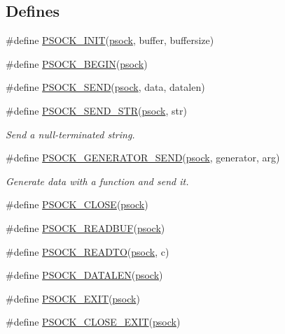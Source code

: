 \subsection*{Defines}
\begin{DoxyCompactItemize}
\item 
\#define \hyperlink{group__psock_ga26ae707402e494f3895a9f012a93ea29}{PSOCK\_\-INIT}(\hyperlink{structpsock}{psock}, buffer, buffersize)
\item 
\#define \hyperlink{group__psock_ga84901a5aa60040e96d272a69977edd22}{PSOCK\_\-BEGIN}(\hyperlink{structpsock}{psock})
\item 
\#define \hyperlink{group__psock_ga70d236d1cf34b4e21836edda60247b70}{PSOCK\_\-SEND}(\hyperlink{structpsock}{psock}, data, datalen)
\item 
\#define \hyperlink{group__psock_gab0ad55aa96dd1d200cd0fc5a99f6a4f7}{PSOCK\_\-SEND\_\-STR}(\hyperlink{structpsock}{psock}, str)
\begin{DoxyCompactList}\small\item\em Send a null-\/terminated string. \item\end{DoxyCompactList}\item 
\#define \hyperlink{group__psock_ga10d9a9201cba1a6db623284c475c6cea}{PSOCK\_\-GENERATOR\_\-SEND}(\hyperlink{structpsock}{psock}, generator, arg)
\begin{DoxyCompactList}\small\item\em Generate data with a function and send it. \item\end{DoxyCompactList}\item 
\#define \hyperlink{group__psock_ga5d56800f82bfc7bbf53bb4a659589812}{PSOCK\_\-CLOSE}(\hyperlink{structpsock}{psock})
\item 
\#define \hyperlink{group__psock_gad895ab98c54d9966ff554aa873151751}{PSOCK\_\-READBUF}(\hyperlink{structpsock}{psock})
\item 
\#define \hyperlink{group__psock_gab5d9c0becf7cb32d0aaef466839dd92e}{PSOCK\_\-READTO}(\hyperlink{structpsock}{psock}, c)
\item 
\#define \hyperlink{group__psock_ga4ab2de595d36e9e55dd61f6ecd139162}{PSOCK\_\-DATALEN}(\hyperlink{structpsock}{psock})
\item 
\#define \hyperlink{group__psock_gafa11b2a1faf395ae2a6626e01c482d5d}{PSOCK\_\-EXIT}(\hyperlink{structpsock}{psock})
\item 
\#define \hyperlink{group__psock_gac7cc1dba1819f7fcdaa9ff9eed5a08f4}{PSOCK\_\-CLOSE\_\-EXIT}(\hyperlink{structpsock}{psock})

\end{DoxyCompactItemize}
